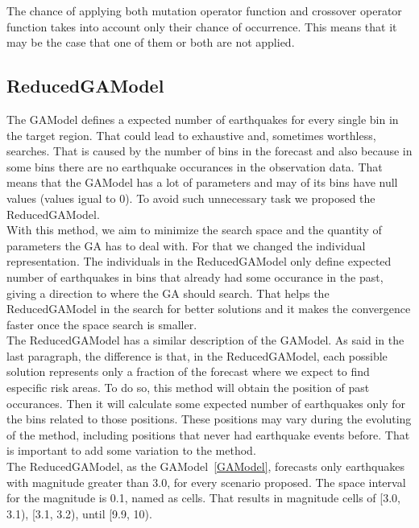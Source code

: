 The chance of applying both mutation operator function and crossover operator function takes into account only their chance of occurrence. This means that it may be the case that one of them or both are not applied.\\

\subsection{ReducedGAModel}\label{ReducedGAModel}
The GAModel defines a expected number of earthquakes for every single bin in the target region. That could lead to exhaustive and, sometimes worthless, searches. That is caused by the number of bins in the forecast and also because in some bins there are no earthquake occurances in the observation data. That means that the GAModel has a lot of parameters and may of its bins have null values (values igual to 0). To avoid such unnecessary task we proposed the ReducedGAModel.\\

With this method, we aim to minimize the search space and the quantity of parameters the GA has to deal with. For that we changed the individual representation. The individuals in the ReducedGAModel only define expected number of earthquakes in bins that already had some occurance in the past, giving a direction to where the GA should search. That helps the ReducedGAModel in the search for better solutions and it makes the convergence faster once the space search is smaller.\\

The ReducedGAModel has a similar description of the GAModel. As said in the last paragraph, the difference is that, in the ReducedGAModel, each possible solution represents only a fraction of the forecast where we expect to find especific risk areas. To do so, this method will obtain the position of past occurances. Then it will calculate some expected number of earthquakes only for the bins related to those positions. These positions may vary during the evoluting of the method, including positions that never had earthquake events before. That is important to add some variation to the method.\\

The ReducedGAModel, as the GAModel~\ref{GAModel}, forecasts only earthquakes with magnitude greater than 3.0, for every scenario proposed. The space interval for the magnitude is 0.1, named as cells. That results in magnitude cells of [3.0, 3.1), [3.1, 3.2), until [9.9, 10).\\

